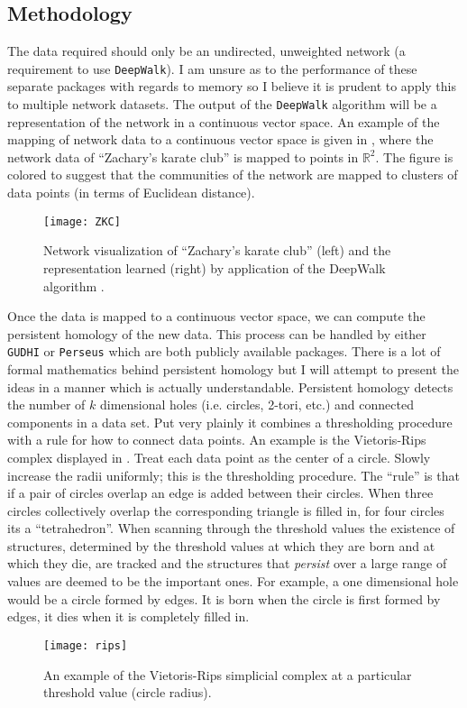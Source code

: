 \documentclass[letter,10pt,openany]{article}
\begin{document}
\subsection{Methodology}
The data required should only be an undirected, unweighted network (a requirement
to use \texttt{DeepWalk}). I am unsure as to the performance of these separate
packages with regards to memory so I believe it is prudent to apply this to multiple
network datasets. The output of the \texttt{DeepWalk} algorithm will be a representation
of the network in a continuous vector space.
An example of the mapping of network data to a continuous
vector space is given in , where the network data
of ``Zachary's karate club'' is mapped to points in
$\mathbb{R}^2$. The figure is colored
to suggest that the communities of the network are mapped to clusters
of data points (in terms of Euclidean distance).
\begin{figure}[t]
\begin{minipage}[height=.5\textheight]{.9\textwidth}
\centering
\texttt{[image: ZKC]}
\end{minipage}
\caption{\label{ZKC}
Network visualization of ``Zachary's karate club'' (left) and
the representation learned (right) by application of the DeepWalk algorithm
\cite{DeepWalk}.
}
\end{figure}
Once the data is mapped to a continuous vector space,
we can compute the persistent homology of the new data.
This process can be handled by
either \texttt{GUDHI}\cite{GUDHI} or \texttt{Perseus} \cite{Perseus}
which are both
publicly available packages.
There is a lot of formal mathematics behind persistent homology \cite{Mischaikow} but
I will attempt to present the ideas in a manner which is actually understandable.
Persistent homology detects the
number of $k$ dimensional holes (i.e. circles, 2-tori, etc.) and
connected components in a data set. Put very plainly it
combines a thresholding procedure with a rule for how to connect
data points. An example is the Vietoris-Rips complex displayed in
. Treat each data point as the center of a circle. Slowly
increase the radii uniformly; this is the thresholding procedure. The ``rule''
is that if a pair of circles overlap an edge is added between their
circles. When three circles collectively overlap the
corresponding triangle is filled in, for four
circles its a ``tetrahedron''.
When scanning through the threshold values the existence of structures,
determined by the threshold values at which they are born and at which they die, are tracked
and the structures that \textit{persist} over a large range of values
are deemed to be the important ones. For example, a one dimensional hole would
be a circle formed by edges. It is born when the circle
is first formed by edges, it dies when it is
completely filled in.
\begin{figure}[t]
\begin{minipage}[height=.5\textheight]{.9\textwidth}
\centering
\texttt{[image: rips]}
\end{minipage}
\caption{\label{rips}
An example of the Vietoris-Rips simplicial complex at a particular
threshold value (circle radius). \cite{Topaz}
}
\end{figure}
\end{document}
